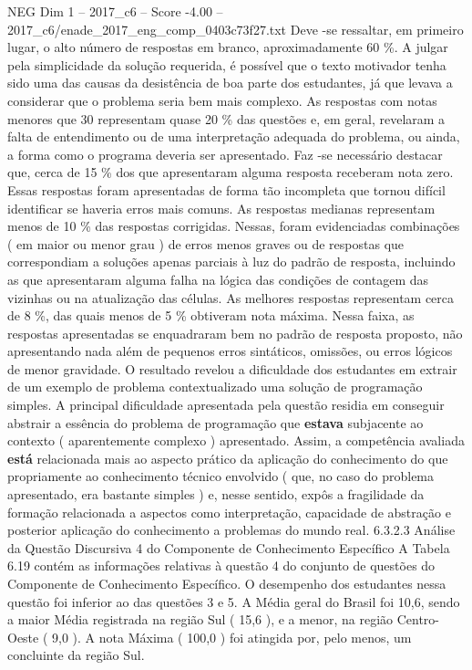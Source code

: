 \begin{textsample}{NEG Dim 1 – 2017\_c6 – Score -4.00 – 2017\_c6/enade\_2017\_eng\_comp\_0403c73f27.txt}
Deve -se ressaltar, em primeiro lugar, o alto número de respostas em branco, aproximadamente 60 \%.
A julgar pela simplicidade da solução requerida, é possível que o texto motivador tenha sido uma das causas da desistência de boa parte dos estudantes, já que levava a considerar que o problema seria bem mais complexo.
As respostas com notas menores que 30 representam quase 20 \% das questões e, em geral, revelaram a falta de entendimento ou de uma interpretação adequada do problema, ou ainda, a forma como o programa deveria ser apresentado.
Faz -se necessário destacar que, cerca de 15 \% dos que apresentaram alguma resposta receberam nota zero.
Essas respostas foram apresentadas de forma tão incompleta que tornou difícil identificar se haveria erros mais comuns.
As respostas medianas representam menos de 10 \% das respostas corrigidas.
Nessas, foram evidenciadas combinações ( em maior ou menor grau ) de erros menos graves ou de respostas que correspondiam a soluções apenas parciais à luz do padrão de resposta, incluindo as que apresentaram alguma falha na lógica das condições de contagem das vizinhas ou na atualização das células.
As melhores respostas representam cerca de 8 \%, das quais menos de 5 \% obtiveram nota máxima.
Nessa faixa, as respostas apresentadas se enquadraram bem no padrão de resposta proposto, não apresentando nada além de pequenos erros sintáticos, omissões, ou erros lógicos de menor gravidade.
O resultado revelou a dificuldade dos estudantes em extrair de um exemplo de problema contextualizado uma solução de programação simples.
A principal dificuldade apresentada pela questão residia em conseguir abstrair a essência do problema de programação que \textbf{estava} subjacente ao contexto ( aparentemente complexo ) apresentado.
Assim, a competência avaliada \textbf{está} relacionada mais ao aspecto prático da aplicação do conhecimento do que propriamente ao conhecimento técnico envolvido ( que, no caso do problema apresentado, era bastante simples ) e, nesse sentido, expôs a fragilidade da formação relacionada a aspectos como interpretação, capacidade de abstração e posterior aplicação do conhecimento a problemas do mundo real. 6.3.2.3 Análise da Questão Discursiva 4 do Componente de Conhecimento Específico A Tabela 6.19 contém as informações relativas à questão 4 do conjunto de questões do Componente de Conhecimento Específico.
O desempenho dos estudantes nessa questão foi inferior ao das questões 3 e 5.
A Média geral do Brasil foi 10,6, sendo a maior Média registrada na região Sul ( 15,6 ), e a menor, na região Centro-Oeste ( 9,0 ).
A nota Máxima ( 100,0 ) foi atingida por, pelo menos, um concluinte da região Sul.

\end{textsample}
